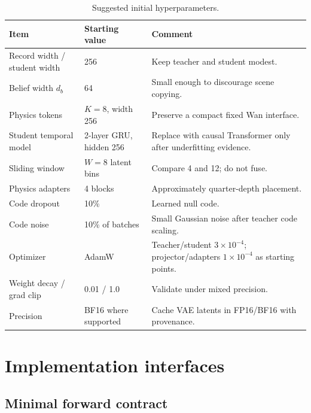 \documentclass[11pt]{article}
\begin{document}
\begin{table}[H]
\centering
\small
\caption{Suggested initial hyperparameters.}
\begin{tabularx}{\textwidth}{L{0.27\textwidth} L{0.20\textwidth} Y}
\toprule
Item & Starting value & Comment \\
\midrule
Record width / student width & 256 & Keep teacher and student modest. \\
Belief width $d_b$ & 64 & Small enough to discourage scene copying. \\
Physics tokens & $K=8$, width 256 & Preserve a compact fixed Wan interface. \\
Student temporal model & 2-layer GRU, hidden 256 & Replace with causal Transformer only after underfitting evidence. \\
Sliding window & $W=8$ latent bins & Compare 4 and 12; do not fuse. \\
Physics adapters & 4 blocks & Approximately quarter-depth placement. \\
Code dropout & 10\% & Learned null code. \\
Code noise & 10\% of batches & Small Gaussian noise after teacher code scaling. \\
Optimizer & AdamW & Teacher/student $3\times10^{-4}$; projector/adapters $1\times10^{-4}$ as starting points. \\
Weight decay / grad clip & 0.01 / 1.0 & Validate under mixed precision. \\
Precision & BF16 where supported & Cache VAE latents in FP16/BF16 with provenance. \\
\bottomrule
\end{tabularx}
\end{table}

\section{Implementation interfaces}

\subsection{Minimal forward contract}
\end{document}
